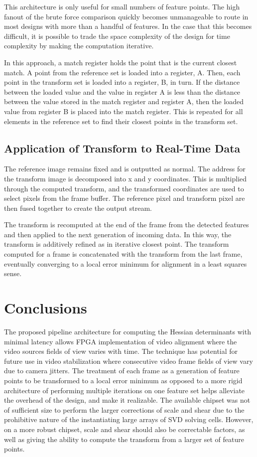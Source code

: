 \documentclass[sigconf]{acmart}
\begin{document}
This architecture is only useful for small numbers of feature points. The high fanout of the brute force comparison quickly becomes unmanageable to route in most designs with more than a handful of features. In the case that this becomes difficult, it is possible to trade the space complexity of the design for time complexity by making the computation iterative.

In this approach, a match register holds the point that is the current closest match. A point from the reference set is loaded into a register, A. Then, each point in the transform set is loaded into a register, B, in turn. If the distance between the loaded value and the value in register A is less than the distance between the value stored in the match register and register A, then the loaded value from register B is placed into the match register. This is repeated for all elements in the reference set to find their closest points in the transform set.

\subsection{Application of Transform to Real-Time Data}

The reference image remains fixed and is outputted as normal. The address for the transform image is decomposed into x and y coordinates. This is multiplied through the computed transform, and the transformed coordinates are used to select pixels from the frame buffer. The reference pixel and transform pixel are then fused together to create the output stream.

The transform is recomputed at the end of the frame from the detected features and then applied to the next generation of incoming data. In this way, the transform is additively refined as in iterative closest point. The transform computed for a frame is concatenated with the transform from the last frame, eventually converging to a local error minimum for alignment in a least squares sense. 

\section{Conclusions}
The proposed pipeline architecture for computing the Hessian determinants with minimal latency allows FPGA implementation of video alignment where the video sources fields of view varies with time. The technique has potential for future use in video stabilization where consecutive video frame fields of view vary due to camera jitters. The treatment of each frame as a generation of feature points to be transformed to a local error minimum as opposed to a more rigid architecture of performing multiple iterations on one feature set helps alleviate the overhead of the design, and make it realizable. The available chipset was not of sufficient size to perform the larger corrections of scale and shear due to the prohibitive nature of the instantiating large arrays of SVD solving cells. However, on a more robust chipset, scale and shear should also be correctable factors, as well as giving the ability to compute the transform from a larger set of feature points.



\end{document}
